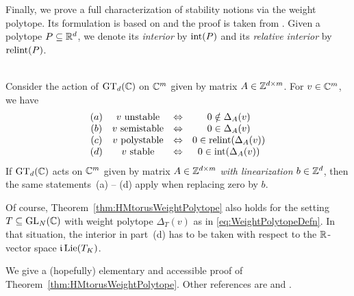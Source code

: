 Finally, we prove a full characterization of stability notions via the weight polytope. Its formulation is based on \cite[Theorem~3.4]{DiscretePaper} and the proof is taken from \cite[Appendix~A]{DiscretePaper}. Given a polytope $P \subseteq \mathbb R^d$, we denote its \emph{interior} by $\operatorname{int}(P)$ and its \emph{relative interior} by $\operatorname{relint}(P)$.

\begin{theorem}
	\label{thm:HMtorusWeightPolytope} %
	\ \\
	Consider the action of $\operatorname{GT}_d(\mathbb C)$ on $\mathbb C^m$ given by matrix $A \in \mathbb Z^{d \times m}$. For $v \in \mathbb C^m$, we have
	\[\begin{matrix}
		(a) & v \text{ unstable} & \Leftrightarrow & 0 \notin \Delta_A(v) \\
		(b) & v \text{ semistable} & \Leftrightarrow & 0 \in \Delta_A(v) \\
		(c) & v \text{ polystable} &  \Leftrightarrow & 0 \in \operatorname{relint}(\Delta_A(v)) \\
		(d) & v \text{ stable} & \Leftrightarrow & 0 \in \operatorname{int}(\Delta_A(v)) \end{matrix}
	\]
	If $\operatorname{GT}_d(\mathbb C)$ acts on $\mathbb C^m$ given by matrix $A \in \mathbb Z^{d \times m}$ \emph{with linearization} $b \in \mathbb Z^d$, then the same statements~(a) -- (d) apply when replacing zero by $b$.
\end{theorem}

\begin{remark}
	Of course, Theorem~\ref{thm:HMtorusWeightPolytope} also holds for the setting $T \subseteq \operatorname{GL}_N(\mathbb C)$ with weight polytope $\Delta_T(v)$ as in \eqref{eq:WeightPolytopeDefn}. In that situation, the interior in part~(d) has to be taken with respect to the $\mathbb R$-vector space $\mathfrak{i} \operatorname{Lie}(T_K)$.
	\hfill\remSymbol
\end{remark}

We give a (hopefully) elementary and accessible proof of Theorem~\ref{thm:HMtorusWeightPolytope}. Other references are \cite[Theorem~9.2]{DolgachevBook} and \cite[Theorem~1.5.1]{Szekelyhidi}.

